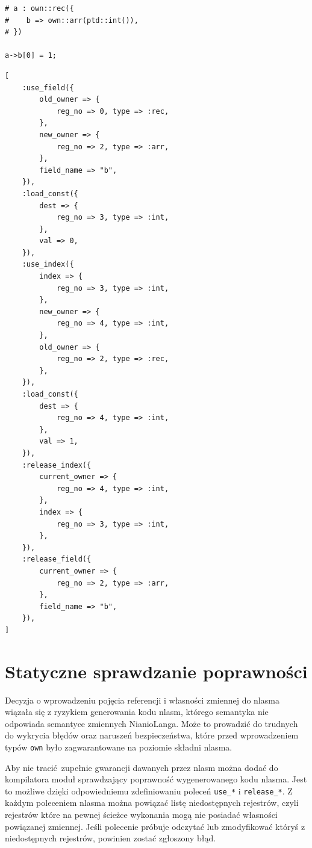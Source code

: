 \documentclass[licencjacka]{pracamgr}
\begin{document}
\noindent\begin{minipage}[t]{.45\textwidth}
\begin{lstlisting}[caption={Modyfikacja zmiennej typu \texttt{own} w NianioLangu},language=nl]
# a : own::rec({
#    b => own::arr(ptd::int()),
# })

a->b[0] = 1;
\end{lstlisting}
\end{minipage}\hfill
\begin{minipage}[t]{.45\textwidth}
\begin{lstlisting}[caption={Modyfikacja zmiennej typu \texttt{own} przetłumaczona na nlasm},label={lst:own_access_nlasm}]
[
    :use_field({
        old_owner => {
            reg_no => 0, type => :rec,
        },
        new_owner => {
            reg_no => 2, type => :arr,
        },
        field_name => "b",
    }),
    :load_const({
        dest => {
            reg_no => 3, type => :int,
        },
        val => 0,
    }),
    :use_index({
        index => {
            reg_no => 3, type => :int,
        },
        new_owner => {
            reg_no => 4, type => :int,
        },
        old_owner => {
            reg_no => 2, type => :rec,
        },
    }),
    :load_const({
        dest => {
            reg_no => 4, type => :int,
        },
        val => 1,
    }),
    :release_index({
        current_owner => {
            reg_no => 4, type => :int,
        },
        index => {
            reg_no => 3, type => :int,
        },
    }),
    :release_field({
        current_owner => {
            reg_no => 2, type => :arr,
        },
        field_name => "b",
    }),
]
\end{lstlisting}
\end{minipage}

\section{Statyczne sprawdzanie poprawności}
Decyzja o wprowadzeniu pojęcia referencji i własności zmiennej do nlasma wiązała się z ryzykiem generowania
kodu nlasm, którego semantyka nie odpowiada semantyce zmiennych NianioLanga.
Może to prowadzić do trudnych do wykrycia błędów oraz naruszeń bezpieczeństwa, które przed wprowadzeniem
typów \texttt{own} było zagwarantowane na poziomie składni nlasma.

Aby nie tracić zupełnie gwarancji dawanych przez nlasm można dodać do kompilatora moduł
sprawdzający poprawność wygenerowanego kodu nlasma. Jest to możliwe dzięki odpowiedniemu zdefiniowaniu poleceń
\texttt{use\_*} i \texttt{release\_*}. Z każdym poleceniem nlasma można powiązać listę niedostępnych
rejestrów, czyli rejestrów które na pewnej ścieżce wykonania mogą nie posiadać własności powiązanej zmiennej.
Jeśli polecenie próbuje odczytać lub zmodyfikować któryś z niedostępnych rejestrów, powinien zostać zgłoszony
błąd.
\end{document}
